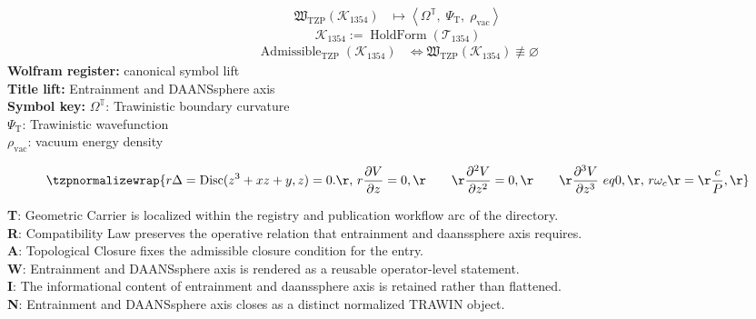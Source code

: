 \noindent
\begin{minipage}[t]{0.48\linewidth}
\begingroup
\small
\[
\begin{aligned}
\mathfrak{W}_{\mathrm{TZP}}\!\left(\mathcal{K}_{1354}\right)
&\longmapsto
\left\langle \Omega^{\mathbb{T}},\; \Psi_{\mathrm{T}},\; \rho_{\mathrm{vac}} \right\rangle
\end{aligned}
\]
\[
\mathcal{K}_{1354}
:=
\operatorname{HoldForm}\!\left(\mathcal{T}_{1354}\right)
\]
\[
\begin{aligned}
\operatorname{Admissible}_{\mathrm{TZP}}\!\left(\mathcal{K}_{1354}\right)
&\Longleftrightarrow
\mathfrak{W}_{\mathrm{TZP}}\!\left(\mathcal{K}_{1354}\right)\not\equiv\varnothing
\end{aligned}
\]
\textbf{Wolfram register:} canonical symbol lift\\
\textbf{Title lift:} Entrainment and DAANSsphere axis\\
\textbf{Symbol key:} \(\Omega^{\mathbb{T}}\): Trawinistic boundary curvature\\ \(\Psi_{\mathrm{T}}\): Trawinistic wavefunction\\ \(\rho_{\mathrm{vac}}\): vacuum energy density
\par
\endgroup
\end{minipage}\hfill
\begin{minipage}[t]{0.48\linewidth}
\[
\tzpnormalizewrap{r \Delta = \mathrm{Disc}(z^{3} + x z + y, z) = 0.\r,\,r \frac{\partial V}{\partial z} = 0,\r \qquad\r \frac{\partial^{2} V}{\partial z^{2}} = 0,\r \qquad\r \frac{\partial^{3} V}{\partial z^{3}} \ eq 0,\r,\,r \omega_{c}\r =\r \frac{c}{P},\r}
\]

\small
\textbf{T}: Geometric Carrier is localized within the registry and publication workflow arc of the directory.\\
\textbf{R}: Compatibility Law preserves the operative relation that entrainment and daanssphere axis requires.\\
\textbf{A}: Topological Closure fixes the admissible closure condition for the entry.\\
\textbf{W}: Entrainment and DAANSsphere axis is rendered as a reusable operator-level statement.\\
\textbf{I}: The informational content of entrainment and daanssphere axis is retained rather than flattened.\\
\textbf{N}: Entrainment and DAANSsphere axis closes as a distinct normalized TRAWIN object.
\normalsize
\end{minipage}

